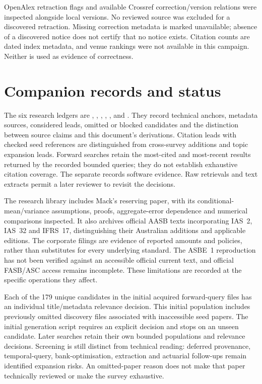 OpenAlex retraction flags and available Crossref correction/version relations
were inspected alongside local versions. No reviewed source was excluded for
a discovered retraction. Missing correction metadata is marked unavailable;
absence of a discovered notice does not certify that no notice exists.
Citation counts are dated index metadata, and venue rankings were not available
in this campaign. Neither is used as evidence of correctness.

\section{Companion records and status}

The six research ledgers are ,
, ,
, , and
. They record technical anchors, metadata sources,
considered leads, omitted or blocked candidates and the distinction between
source claims and this document's derivations. Citation leads with checked
seed references are distinguished from cross-survey additions and topic
expansion leads. Forward searches retain the most-cited and most-recent
results returned by the recorded bounded queries; they do not establish
exhaustive citation coverage. The separate 
records software evidence. Raw retrievals and text extracts permit a later
reviewer to revisit the decisions.

The research library includes Mack's reserving paper, with its conditional-mean/variance
assumptions, proofs, aggregate-error dependence and numerical comparisons
inspected. It also archives official AASB texts incorporating IAS~2, IAS~32
and IFRS~17, distinguishing their Australian additions and applicable editions.
The corporate filings are evidence of reported amounts and policies, rather
than substitutes for every underlying standard. The ASBE~1 reproduction has
not been verified against an accessible official current text, and official
FASB/ASC access remains incomplete. These limitations are recorded at the
specific operations they affect.

Each of the 179 unique candidates in the initial acquired forward-query
files has an individual title/metadata relevance decision. This initial
population includes previously omitted discovery files associated with
inaccessible seed papers. The initial generation script requires an explicit
decision and stops on an unseen candidate. Later searches retain their own
bounded populations and relevance decisions. Screening is still distinct from technical reading: deferred
provenance, temporal-query, bank-optimisation, extraction and actuarial
follow-ups remain identified expansion risks. An omitted-paper reason does
not make that paper technically reviewed or make the survey exhaustive.

